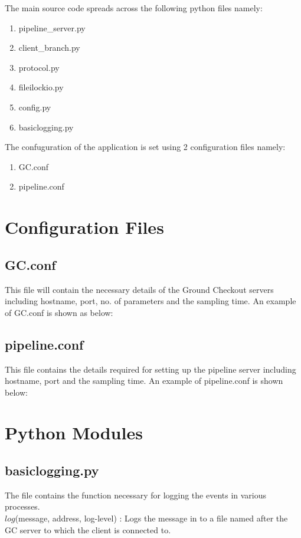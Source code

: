 The main source code spreads across the following python files namely:
\begin{enumerate}
	\item pipeline\_server.py
	\item client\_branch.py
	\item protocol.py
	\item fileilockio.py
	\item config.py
	\item basiclogging.py
\end{enumerate}
The confuguration of the application is set using 2 configuration files namely:
\begin{enumerate}
	\item GC.conf
	\item pipeline.conf
\end{enumerate}

\section{Configuration Files}

\subsection{GC.conf}
This file will contain the necessary details of the Ground Checkout servers
including hostname, port, no. of parameters and the sampling time. An example
of GC.conf is shown as below:


\subsection{pipeline.conf}
This file contains the details required for setting up the pipeline server
including hostname, port and the sampling time. An example of pipeline.conf is
shown below:



\section{Python Modules}

\subsection{basiclogging.py}
The file contains the function necessary for logging the events in various
processes.\\
$log$(message, address, log-level) : Logs the message
in to a file named after the GC server to which the client is connected to.

